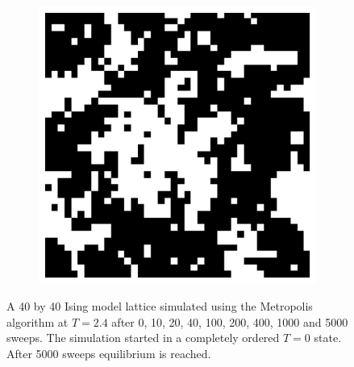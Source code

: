 \documentclass[11pt, a4paper]{report} %
\begin{document}
\begin{figure}[htb]
\begin{subfigure}[c]{0.2\linewidth}
	\end{subfigure}
	~
	\begin{subfigure}[c]{0.2\linewidth}
		\includegraphics[width=\linewidth]{20160603125722_40_by_40_Lattice_step5000.pdf}
	\end{subfigure}
	\caption{A 40 by 40 Ising model lattice simulated using the Metropolis algorithm at \(T=2.4\) after 0, 10, 20, 40, 100, 200, 400, 1000	and 5000 sweeps. The simulation started in a completely ordered \(T=0\) state. After 5000 sweeps equilibrium is reached.}
	\label{fig:metropolis_ising_at_steps}
\end{figure}
\end{document}
